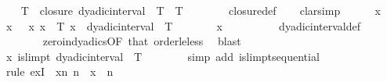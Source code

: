 \begin{isabellebody}
\ \ \isamarkupfalse%
\ {\isachardoublequoteopen}{\isacharbraceleft}{\kern0pt}{}{\isachardot}{\kern0pt}{\isachardot}{\kern0pt}T{\isacharbraceright}{\kern0pt}\ {\isasymsubseteq}\ closure\ {\isacharparenleft}{\kern0pt}dyadic{\isacharunderscore}{\kern0pt}interval\ {}\ T{\isacharparenright}{\kern0pt}{\isachardoublequoteclose}\ \ {\isachardoublequoteopen}T\ {\isasymge}\ {}{\isachardoublequoteclose}\isanewline
\ \ \ \ \isamarkupfalse%
\ closure{\isacharunderscore}{\kern0pt}def\isanewline
\ \ \isamarkupfalse%
\ {\isacharparenleft}{\kern0pt}clarsimp{\isacharparenright}{\kern0pt}\isanewline
\ \ \ \ \isamarkupfalse%
\ x\ \isamarkupfalse%
\ x{\isacharcolon}{\kern0pt}\ {\isachardoublequoteopen}{}\ {\isasymle}\ x{\isachardoublequoteclose}\ {\isachardoublequoteopen}x\ {\isasymle}\ T{\isachardoublequoteclose}\ {\isachardoublequoteopen}x\ {\isasymnotin}\ dyadic{\isacharunderscore}{\kern0pt}interval\ {}\ T{\isachardoublequoteclose}\isanewline
\ \ \ \ \isamarkupfalse%
\ \isamarkupfalse%
\ {\isachardoublequoteopen}x\ {\isachargreater}{\kern0pt}\ {}{\isachardoublequoteclose}\isanewline
\ \ \ \ \ \ \isamarkupfalse%
\ dyadic{\isacharunderscore}{\kern0pt}interval{\isacharunderscore}{\kern0pt}def\isanewline
\ \ \ \ \ \ \isamarkupfalse%
\ zero{\isacharunderscore}{\kern0pt}in{\isacharunderscore}{\kern0pt}dyadics{\isacharbrackleft}{\kern0pt}OF\ that{\isacharbrackright}{\kern0pt}\ order{\isacharunderscore}{\kern0pt}le{\isacharunderscore}{\kern0pt}less\ \isamarkupfalse%
\ blast\isanewline
\ \ \ \ \isamarkupfalse%
\ {\isachardoublequoteopen}x\ islimpt\ {\isacharparenleft}{\kern0pt}dyadic{\isacharunderscore}{\kern0pt}interval\ {}\ T{\isacharparenright}{\kern0pt}{\isachardoublequoteclose}\isanewline
\ \ \ \ \ \ \isamarkupfalse%
\ {\isacharparenleft}{\kern0pt}simp\ add{\isacharcolon}{\kern0pt}\ islimpt{\isacharunderscore}{\kern0pt}sequential{\isacharparenright}{\kern0pt}\isanewline
\ \ \ \ \ \ \isamarkupfalse%
\ {\isacharparenleft}{\kern0pt}rule\ exI\ {\isacharbrackleft}{\kern0pt}\ x{\isacharequal}{\kern0pt}{\isachardoublequoteopen}{\isasymlambda}n{\isachardot}{\kern0pt}\ {\isasymlfloor}{}{\isacharcircum}{\kern0pt}n\ {\isacharasterisk}{\kern0pt}\ x{\isasymrfloor}\ {\isacharslash}{\kern0pt}\ {}{\isacharcircum}{\kern0pt}n{\isachardoublequoteclose}{\isacharbrackright}{\kern0pt}{\isacharparenright}{\kern0pt}\isanewline

\end{isabellebody}
